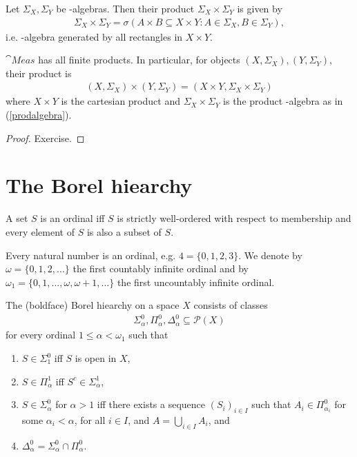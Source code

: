 \documentclass{article}
\begin{document}
\begin{definition}
	Let $\Sigma_X,\Sigma_Y$ be \sigma-algebras. Then their product $\Sigma_X\times\Sigma_Y$ is given by
	\begin{align}
		\label{prodalgebra}
		\Sigma_X\times\Sigma_Y=\sigma\left(A\times B\subseteq X\times Y : A\in\Sigma_X,B\in\Sigma_Y\right),
	\end{align}
	i.e. \sigma-algebra generated by all rectangles in $X\times Y$.
\end{definition}

\begin{proposition}
	$\cat{Meas}$ has all finite products. In particular, for objects $(X,\Sigma_X),(Y,\Sigma_Y)$,
	their product is 
	\begin{align*}
		(X,\Sigma_X)\times(Y,\Sigma_Y)=(X\times Y,\Sigma_X\times\Sigma_Y)
	\end{align*}
	where $X\times Y$ is the cartesian product and $\Sigma_X\times\Sigma_Y$ is the product \sigma-algebra 
	as in (\ref{prodalgebra}).
	\begin{proof}
		Exercise.
	\end{proof}
\end{proposition}


\section{The Borel hiearchy}

\begin{definition}
	A set $S$ is an ordinal iff $S$ is strictly well-ordered with respect to membership and every 
	element of $S$ is also a subset of $S$.

	Every natural number is an ordinal, e.g. $4=\{0,1,2,3\}$. We denote by $\omega=\{0,1,2,...\}$ the first countably 
	infinite ordinal and by $\omega_1=\{0,1,...,\omega,\omega+1,...\}$ the first uncountably infinite ordinal.
\end{definition}

\begin{definition}
	The (boldface) Borel hiearchy on a space $X$ consists of classes 
	\begin{align*}
		\Sigma_\alpha^0,\Pi_\alpha^0,\Delta_\alpha^0\subseteq\mathcal{P}(X)
	\end{align*}
	for every ordinal $1\leq\alpha<\omega_1$ such that 
	\begin{enumerate}
		\item $S\in\Sigma_1^0$ iff $S$ is open in $X$,
		\item $S\in\Pi_\alpha^1$ iff $S^c\in\Sigma_\alpha^1$,
		\item $S\in\Sigma_\alpha^0$ for $\alpha>1$ iff there exists a sequence $(S_i)_{i\in I}$ such that
			$A_i\in\Pi_{\alpha_i}^0$ for some $\alpha_i<\alpha$, for all $i\in I$, and $A=\bigcup_{i\in I} A_i$, and 
		\item $\Delta_\alpha^0=\Sigma_\alpha^0\cap\Pi^0_\alpha$.
	\end{enumerate}
\end{definition}
\end{document}
